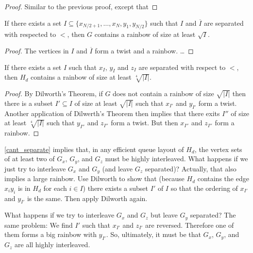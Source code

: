 \documentclass{patmorin}
\begin{document}
\begin{proof}
    Similar to the previous proof, except that
\end{proof}


\begin{obs}\label{cant_separate2}
    If there exists a set $I\subseteq\{x_{N/2+1},\ldots,x_{N},y_{1},y_{N/2}\}$ such that $I$ and $\overline{I}$ are separated with respected to $<$, then $G$ contains a rainbow of size at least $\sqrt{I}$.
\end{obs}

\begin{proof}
The vertices in $I$ and $\overline{I}$ form a twist and a rainbow. \ldots
\end{proof}

\begin{obs}\label{cant_separate3}
    If there exists a set $I$ such that $x_I$, $y_I$ and $z_I$ are separated with respect to $<$, then $H_d$ contains a rainbow of size at least $\sqrt[4]{|I|}$.
\end{obs}

\begin{proof}
    By Dilworth's Theorem, if $G$ does not contain a rainbow of size $\sqrt{|I|}$ then there is a subset $I'\subseteq I$ of size at least $\sqrt{|I|}$ such that $x_{I'}$ and $y_{I'}$ form a twist.  Another application of Dilwerth's Theorem then implies that there exits $I''$ of size at least $\sqrt[4]{|I|}$ such that $y_{I''}$ and  $z_{I''}$ form a twist.  But then $x_{I''}$ and $z_{I''}$ form a rainbow.
\end{proof}


\cref{cant_separate} implies that, in any efficient queue layout of $H_d$, the vertex sets of at least two of $G_x$, $G_y$, and $G_z$ must be highly interleaved.  What happens if we just try to interleave $G_x$ and $G_y$ (and leave $G_z$ separated)?  Actually, that also implies a large rainbow.  Use Dilworth to show that (because $H_d$ contains the edge $x_{i}y_i$ is in $H_d$ for each $i\in I$) there exists a subset $I'$ of $I$ so that the ordering of $x_{I'}$ and $y_{I'}$ is the same.  Then apply Dilworth again.

What happens if we try to interleave $G_x$ and $G_z$ but leave $G_y$ separated?  The same problem:  We find $I'$ such that $x_{I'}$ and $z_{I'}$ are reversed.  Therefore one of them forms a big rainbow with $y_{I'}$.  So, ultimately, it must be that $G_x$, $G_y$, and $G_z$ are all highly interleaved.
\end{document}
